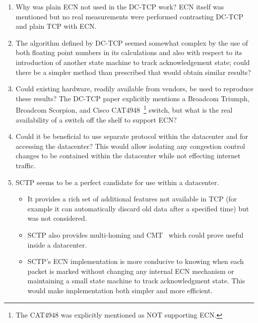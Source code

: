 \documentclass[12pt]{article}
\begin{document}
\begin{enumerate}
\item Why was plain ECN not used in the DC-TCP work? ECN itself was mentioned but no
real measurements were performed contrasting DC-TCP and plain TCP with ECN.

\item The algorithm defined by DC-TCP seemed somewhat complex by the use
of both floating point numbers in its calculations and also with respect to its introduction
of another state machine to track acknowledgement state; could there be a simpler method than prescribed that would obtain similar results?

\item Could existing hardware, readily available from vendors, be used to reproduce these results? The
DC-TCP paper explicitly mentions a  Broadcom Triumph,  Broadcom Scorpion, and Cisco CAT4948~\footnote{The 
CAT4948 was explicitly mentioned as NOT supporting ECN.} switch, but what is the real availability of 
a switch off the shelf to support ECN?

\item Could it be beneficial to use separate protocol within the datacenter and for accessing the datacenter?
      This would allow isolating any congestion control changes to be contained within the datacenter
      while not effecting internet traffic.

\item SCTP seems to be a perfect candidate for use within a datacenter.

\begin{itemize}
\item It provides a rich set of additional features not available in
      TCP (for example it can automatically discard old data after a specified time) but was not considered. 

\item SCTP also provides multi-homing and CMT~\cite{jana} which could prove useful inside a datacenter.

\item SCTP's ECN implementation is more conducive to knowing when each packet is marked without
      changing any internal ECN mechanism or maintaining a small state machine to track acknowledgment state. 
      This would make implementation both simpler and more efficient.
\end{itemize}

\end{enumerate}
\end{document}
